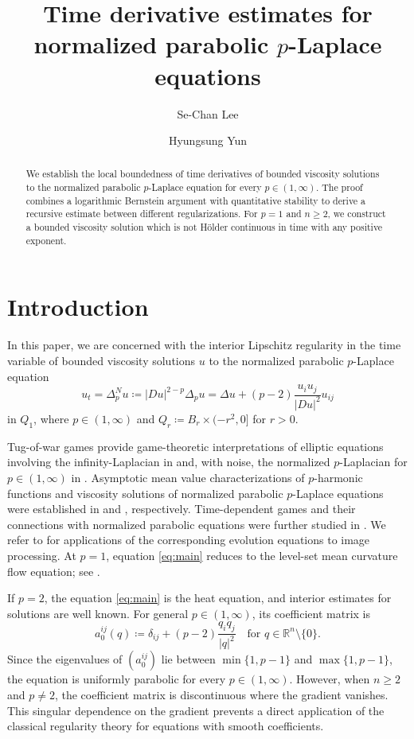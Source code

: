 \documentclass[a4paper,11pt]{amsart}
\title[Time derivative estimates]{Time derivative estimates for normalized parabolic $p$-Laplace equations}
\author{Se-Chan Lee}
\author{Hyungsung Yun}
\theoremstyle{plain}
\theoremstyle{definition}
\numberwithin{equation}{section}
\begin{document}
\begin{abstract}
We establish the local boundedness of time derivatives of bounded viscosity solutions to the normalized parabolic $p$-Laplace equation for every $p\in(1,\infty)$. The proof combines a logarithmic Bernstein argument with quantitative stability to derive a recursive estimate between different regularizations. For $p=1$ and $n\geq2$, we construct a bounded viscosity solution which is not H\"older continuous in time with any positive exponent.
\end{abstract}

\maketitle

\section{Introduction}
In this paper, we are concerned with the interior Lipschitz regularity in the time variable of bounded viscosity solutions $u$ to the normalized parabolic $p$-Laplace equation
\begin{equation}\label{eq:main}
 u_t=\Delta_p^N u
 \coloneqq |Du|^{2-p}\Delta_pu
 =\Delta u+(p-2)\frac{u_i u_j}{|Du|^2}u_{ij}
\end{equation}
in $Q_1$, where $p\in(1,\infty)$ and $Q_r\coloneqq B_r\times(-r^2,0]$ for $r>0$. 

Tug-of-war games provide game-theoretic interpretations of elliptic equations involving the infinity-Laplacian in \cite{PSSW09} and, with noise, the normalized $p$-Laplacian for $p\in(1,\infty)$ in \cite{PS08}. Asymptotic mean value characterizations of $p$-harmonic
functions and viscosity solutions of normalized parabolic $p$-Laplace equations were established in \cite{MPR10a} and \cite{MPR10b}, respectively. Time-dependent games and their connections with normalized parabolic equations were further studied in \cite{Han22, PR16}. We refer to \cite{Doe11} for applications of the corresponding evolution equations to image processing. At $p=1$, equation \eqref{eq:main} reduces to the level-set mean curvature flow equation; see \cite{CGG91,ES91}.

If $p=2$, the equation \eqref{eq:main} is the heat equation, and interior estimates for solutions are well known. For general $p\in(1,\infty)$, its coefficient matrix is
\begin{equation*}
    a_0^{ij}(q)\coloneqq\delta_{ij}+(p-2)\frac{q_iq_j}{|q|^2} \quad\text{for $q \in \mathbb{R}^n \setminus\{0\}$}.
\end{equation*}
Since the eigenvalues of $(a_0^{ij})$ lie between $\min\{1,p-1\}$ and $\max\{1,p-1\}$, the equation is uniformly parabolic for every $p \in (1, \infty)$. However, when $n\geq2$ and $p\ne2$, the coefficient matrix is discontinuous where the gradient vanishes. This singular dependence on the gradient prevents a direct application of the classical regularity theory for equations with smooth coefficients.
\end{document}
